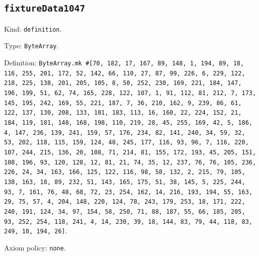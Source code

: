 \documentclass[11pt]{article}
\begin{document}
\subsection*{\texttt{fixtureData1047}}
\noindent Kind: \texttt{definition}.\par
\noindent Type: \texttt{ByteArray}.\par
\noindent Definition: \texttt{ByteArray.mk \#[70, 182, 17, 167, 89, 148, 1, 194, 89, 18, 116, 255, 201, 172, 52, 142, 66, 110, 27, 87, 99, 226, 6, 229, 122, 218, 225, 138, 201, 205, 105, 8, 50, 252, 230, 169, 221, 184, 147, 196, 199, 51, 62, 74, 165, 228, 122, 107, 1, 91, 112, 81, 212, 7, 173, 145, 195, 242, 169, 55, 221, 187, 7, 36, 210, 162, 9, 239, 86, 61, 122, 137, 130, 208, 133, 101, 183, 113, 16, 160, 22, 224, 152, 21, 184, 119, 181, 148, 168, 198, 110, 219, 28, 45, 255, 169, 42, 5, 186, 4, 147, 236, 139, 241, 159, 57, 176, 234, 82, 141, 240, 34, 59, 32, 53, 202, 118, 115, 159, 124, 48, 245, 177, 116, 93, 96, 7, 116, 220, 107, 244, 215, 136, 20, 108, 71, 214, 81, 155, 172, 193, 45, 205, 151, 108, 196, 93, 120, 128, 12, 81, 21, 74, 35, 12, 237, 76, 76, 105, 236, 226, 24, 34, 163, 166, 125, 122, 116, 98, 58, 132, 2, 215, 79, 105, 138, 163, 18, 89, 232, 51, 143, 165, 175, 51, 38, 145, 5, 225, 244, 93, 7, 161, 76, 48, 68, 72, 23, 254, 162, 14, 216, 193, 194, 55, 163, 29, 75, 57, 4, 204, 148, 220, 124, 78, 243, 179, 253, 18, 171, 222, 240, 191, 124, 34, 97, 154, 58, 250, 71, 88, 187, 55, 66, 185, 205, 93, 252, 254, 118, 241, 4, 14, 230, 39, 18, 144, 83, 79, 44, 118, 83, 249, 10, 194, 26]}.\par
\noindent Axiom policy: \texttt{none}.\par
\end{document}
